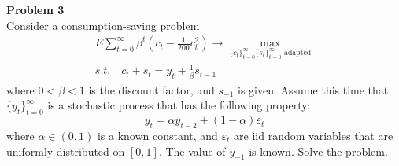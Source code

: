 \documentclass{article}
\newenvironment{problem}[2][Problem]
    { \begin{mdframed}[backgroundcolor=gray!20] \textbf{#1 #2} \\}
    {  \end{mdframed}}
\begin{document}
\begin{problem}{3}
	Consider a consumption-saving problem
	\begin{gather*}
		E \sum_{t=0}^{\infty}\beta^{t}\left( c_{t} - \frac{1}{200}c^{2}_{t} \right) \to \max_{\{c_{t}\}_{t=0}^{\infty} \{s_{t}\}_{t=0}^{\infty}\text{ adapted}} \\
		s.t. \quad c_{t} + s_{t} = y_{t} + \frac{1}{\beta}s_{t-1}
	\end{gather*}
	where $ 0 < \beta < 1 $ is the discount factor, and $ s_{-1} $ is given. Assume this time that $ \{y_{t}\}_{t=0}^{\infty} $ is a stochastic process that has the following property:
	\[
		y_{t} = \alpha y_{t-2} + (1-\alpha)\varepsilon_{t}
	\] where $ \alpha \in (0, 1) $ is a known constant, and $ \varepsilon_{t} $ are iid random variables that are uniformly distributed on $ [0, 1] $. The value of $ y_{-1} $ is known. Solve the problem.
\end{problem}
\end{document}
